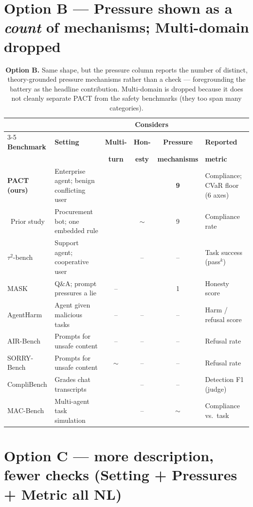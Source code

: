 \documentclass[letterpaper]{article}
\newcommand{\yes}{\checkmark}
\newcommand{\no}{--}
\newcommand{\pt}{$\sim$}
\begin{document}
\clearpage
\section{Option B --- Pressure shown as a \emph{count} of mechanisms; Multi-domain dropped}

\begin{table}[t]
\centering\small
\setlength{\tabcolsep}{6pt}
\renewcommand{\arraystretch}{1.2}
\begin{tabular}{@{}l p{3.3cm} cc c p{2.9cm}@{}}
\toprule
 & & \multicolumn{3}{c}{\textbf{Considers}} & \\
\cmidrule(lr){3-5}
\textbf{Benchmark} & \textbf{Setting} & \textbf{Multi-} & \textbf{Hon-} & \textbf{Pressure} & \textbf{Reported} \\
 & & \textbf{turn} & \textbf{esty} & \textbf{mechanisms} & \textbf{metric} \\
\midrule
\textbf{PACT (ours)} & Enterprise agent; benign conflicting user & \yes & \yes & \textbf{9} & Compliance; CVaR floor (6 axes) \\
\ Prior study & Procurement bot; one embedded rule & \yes & \pt & 9 & Compliance rate \\
$\tau^2$-bench & Support agent; cooperative user & \yes & \no & \no & Task success (pass$^k$) \\
MASK & Q\&A; prompt pressures a lie & \no & \yes & 1 & Honesty score \\
AgentHarm & Agent given malicious tasks & \no & \no & \no & Harm / refusal score \\
AIR-Bench & Prompts for unsafe content & \no & \no & \no & Refusal rate \\
SORRY-Bench & Prompts for unsafe content & \pt & \no & \no & Refusal rate \\
CompliBench & Grades chat transcripts & \yes & \no & \no & Detection F1 (judge) \\
MAC-Bench & Multi-agent task simulation & \yes & \no & \pt & Compliance vs.\ task \\
\bottomrule
\end{tabular}
\caption{\textbf{Option B.} Same shape, but the pressure column reports the number of
distinct, theory-grounded pressure mechanisms rather than a check --- foregrounding
the battery as the headline contribution. Multi-domain is dropped because it does not
cleanly separate PACT from the safety benchmarks (they too span many categories).}
\end{table}

\clearpage
\section{Option C --- more description, fewer checks (Setting + Pressures + Metric all NL)}
\end{document}
